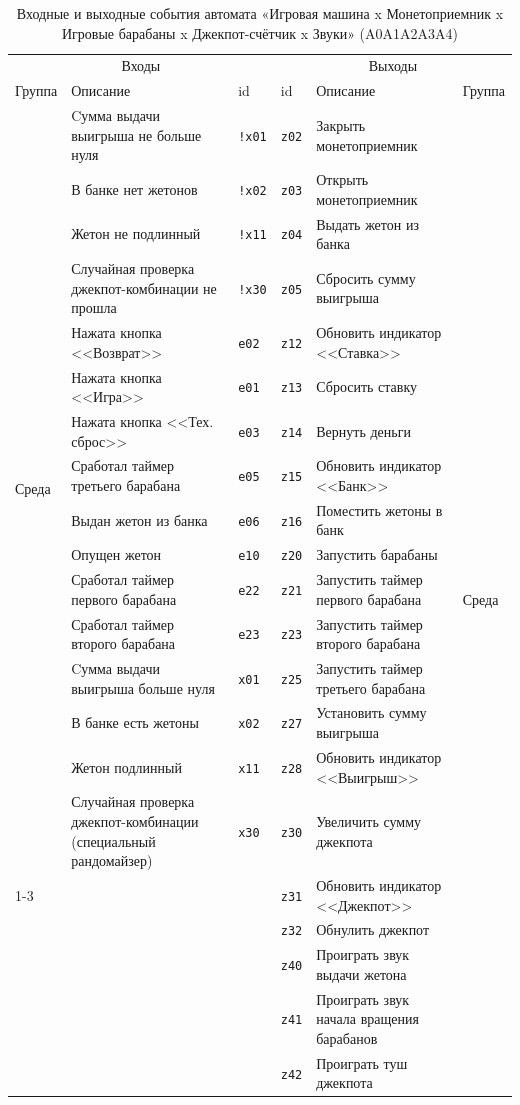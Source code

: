 \begin{table}[H]
\centering
\caption{Входные и выходные события автомата «Игровая машина x Монетоприемник x Игровые барабаны x Джекпот-счётчик x Звуки» (A0A1A2A3A4)}
\small
\begin{tabular}{@{}p{1.3cm}p{4.6cm}l|lp{4.6cm}p{1.3cm}@{}}
\toprule
\multicolumn{3}{c}{Входы} & \multicolumn{3}{c}{Выходы} \\
Группа & Описание & id & id & Описание & Группа \\
\midrule
\multirow{16}{*}{Среда} & Cумма выдачи выигрыша не больше нуля & \texttt{!x01} & \texttt{z02} & Закрыть монетоприемник & \multirow{21}{*}{Среда} \\
 & В банке нет жетонов & \texttt{!x02} & \texttt{z03} & Открыть монетоприемник &  \\
 & Жетон не подлинный & \texttt{!x11} & \texttt{z04} & Выдать жетон из банка &  \\
 & Случайная проверка джекпот-комбинации не прошла & \texttt{!x30} & \texttt{z05} & Сбросить сумму выигрыша &  \\
 & Нажата кнопка <<Возврат>> & \texttt{e02} & \texttt{z12} & Обновить индикатор <<Ставка>> &  \\
 & Нажата кнопка <<Игра>> & \texttt{e01} & \texttt{z13} & Сбросить ставку &  \\
 & Нажата кнопка <<Тех. сброс>> & \texttt{e03} & \texttt{z14} & Вернуть деньги &  \\
 & Сработал таймер третьего барабана & \texttt{e05} & \texttt{z15} & Обновить индикатор <<Банк>> &  \\
 & Выдан жетон из банка & \texttt{e06} & \texttt{z16} & Поместить жетоны в банк &  \\
 & Опущен жетон & \texttt{e10} & \texttt{z20} & Запустить барабаны &  \\
 & Сработал таймер первого барабана & \texttt{e22} & \texttt{z21} & Запустить таймер первого барабана &  \\
 & Сработал таймер второго барабана & \texttt{e23} & \texttt{z23} & Запустить таймер второго барабана &  \\
 & Cумма выдачи выигрыша больше нуля & \texttt{x01} & \texttt{z25} & Запустить таймер третьего барабана &  \\
 & В банке есть жетоны & \texttt{x02} & \texttt{z27} & Установить сумму выигрыша &  \\
 & Жетон подлинный & \texttt{x11} & \texttt{z28} & Обновить индикатор <<Выигрыш>> &  \\
 & Случайная проверка джекпот-комбинации (специальный рандомайзер) & \texttt{x30} & \texttt{z30} & Увеличить сумму джекпота &  \\
\cline{1-3}
 &  &  & \texttt{z31} & Обновить индикатор <<Джекпот>> &  \\
 &  &  & \texttt{z32} & Обнулить джекпот &  \\
 &  &  & \texttt{z40} & Проиграть звук выдачи жетона &  \\
 &  &  & \texttt{z41} & Проиграть звук начала вращения барабанов &  \\
 &  &  & \texttt{z42} & Проиграть туш джекпота &  \\
\bottomrule
\end{tabular}
\end{table}